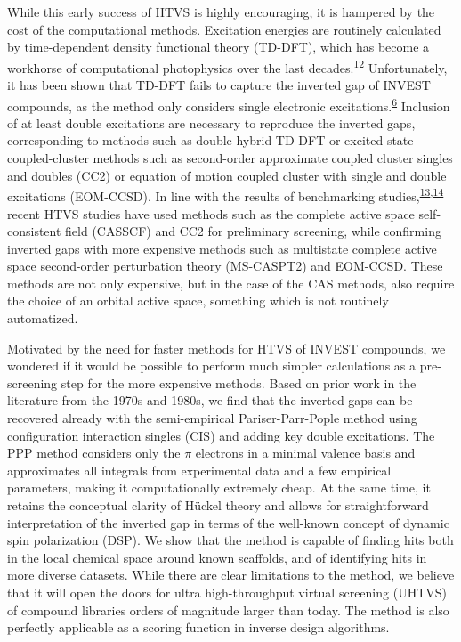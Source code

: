 \documentclass[
  number,
  3p]{elsarticle}
\begin{document}
While this early success of HTVS is highly encouraging, it is hampered
by the cost of the computational methods. Excitation energies are
routinely calculated by time-dependent density functional theory
(TD-DFT), which has become a workhorse of computational photophysics
over the last
decades.\textsuperscript{\protect\hyperlink{ref-casidaProgressTimeDependentDensityFunctional2012}{12}}
Unfortunately, it has been shown that TD-DFT fails to capture the
inverted gap of INVEST compounds, as the method only considers single
electronic
excitations.\textsuperscript{\protect\hyperlink{ref-desilvaInvertedSingletTriplet2019}{6}}
Inclusion of at least double excitations are necessary to reproduce the
inverted gaps, corresponding to methods such as double hybrid TD-DFT or
excited state coupled-cluster methods such as second-order approximate
coupled cluster singles and doubles (CC2) or equation of motion coupled
cluster with single and double excitations (EOM-CCSD). In line with the
results of benchmarking
studies,\textsuperscript{\protect\hyperlink{ref-ricciSingletTripletExcited2021}{13},\protect\hyperlink{ref-sancho-garciaViolationHundRule2022}{14}}
recent HTVS studies have used methods such as the complete active space
self-consistent field (CASSCF) and CC2 for preliminary screening, while
confirming inverted gaps with more expensive methods such as multistate
complete active space second-order perturbation theory (MS-CASPT2) and
EOM-CCSD. These methods are not only expensive, but in the case of the
CAS methods, also require the choice of an orbital active space,
something which is not routinely automatized.

Motivated by the need for faster methods for HTVS of INVEST compounds,
we wondered if it would be possible to perform much simpler calculations
as a pre-screening step for the more expensive methods. Based on prior
work in the literature from the 1970s and 1980s, we find that the
inverted gaps can be recovered already with the semi-empirical
Pariser-Parr-Pople method using configuration interaction singles (CIS)
and adding key double excitations. The PPP method considers only the
\(\pi\) electrons in a minimal valence basis and approximates all
integrals from experimental data and a few empirical parameters, making
it computationally extremely cheap. At the same time, it retains the
conceptual clarity of Hückel theory and allows for straightforward
interpretation of the inverted gap in terms of the well-known concept of
dynamic spin polarization (DSP). We show that the method is capable of
finding hits both in the local chemical space around known scaffolds,
and of identifying hits in more diverse datasets. While there are clear
limitations to the method, we believe that it will open the doors for
ultra high-throughput virtual screening (UHTVS) of compound libraries
orders of magnitude larger than today. The method is also perfectly
applicable as a scoring function in inverse design algorithms.
\end{document}
